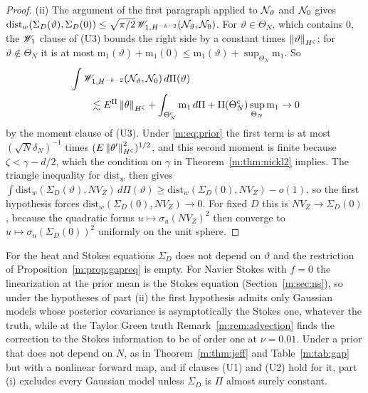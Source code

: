 \begin{proof}
(ii) The argument of the first paragraph applied to $\mathcal{N}_\vartheta$ and $\mathcal{N}_0$ gives $\mathrm{dist}_w(\Sigma_D(\vartheta),\Sigma_D(0))\le\sqrt{\pi/2}\,\mathscr{W}_{1,H^{-k-2}}(\mathcal{N}_\vartheta,\mathcal{N}_0)$. For $\vartheta\in\Theta_N$, which contains $0$, the $\mathscr{W}_1$ clause of (U3) bounds the right side by a constant times $\left\|\vartheta\right\|_{H^\zeta}$; for $\vartheta\notin\Theta_N$ it is at most $\mathrm m_1(\vartheta)+\mathrm m_1(0)\le\mathrm m_1(\vartheta)+\sup_{\Theta_N}\mathrm m_1$. So
\[
\begin{aligned}
&\int\mathscr{W}_{1,H^{-k-2}}(\mathcal{N}_\vartheta,\mathcal{N}_0)\,d\Pi(\vartheta)\\
&\qquad\lesssim E^\Pi\left\|\theta\right\|_{H^\zeta}+\int_{\Theta_N^c}\mathrm m_1\,d\Pi+\Pi(\Theta_N^c)\sup_{\Theta_N}\mathrm m_1\to0
\end{aligned}
\]
by the moment clause of (U3). Under \eqref{m:eq:prior} the first term is at most $(\sqrt N\delta_N)^{-1}$ times $(E\left\|\theta'\right\|^2_{H^\zeta})^{1/2}$, and this second moment is finite because $\zeta<\gamma-d/2$, which the condition on $\gamma$ in Theorem~\ref{m:thm:nickl2} implies. The triangle inequality for $\mathrm{dist}_w$ then gives $\int\mathrm{dist}_w(\Sigma_D(\vartheta),NV_Z)\,d\Pi(\vartheta)\ge\mathrm{dist}_w(\Sigma_D(0),NV_Z)-o(1)$, so the first hypothesis forces $\mathrm{dist}_w(\Sigma_D(0),NV_Z)\to0$. For fixed $D$ this is $NV_Z\to\Sigma_D(0)$, because the quadratic forms $u\mapsto\sigma_u(NV_Z)^2$ then converge to $u\mapsto\sigma_u(\Sigma_D(0))^2$ uniformly on the unit sphere.
\end{proof}

For the heat and Stokes equations $\Sigma_D$ does not depend on $\vartheta$ and the restriction of Proposition~\ref{m:prop:gapreq} is empty. For Navier Stokes with $f=0$ the linearization at the prior mean is the Stokes equation (Section~\ref{m:sec:ns}), so under the hypotheses of part (ii) the first hypothesis admits only Gaussian models whose posterior covariance is asymptotically the Stokes one, whatever the truth, while at the Taylor Green truth Remark~\ref{m:rem:advection} finds the correction to the Stokes information to be of order one at $\nu=0.01$. Under a prior that does not depend on $N$, as in Theorem~\ref{m:thm:jeff} and Table~\ref{m:tab:gap} but with a nonlinear forward map, and if clauses (U1) and (U2) hold for it, part (i) excludes every Gaussian model unless $\Sigma_D$ is $\Pi$ almost surely constant.

